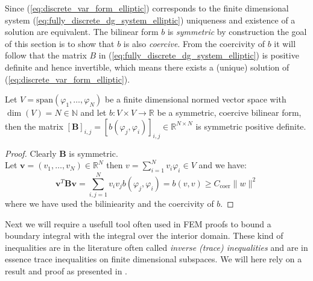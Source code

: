 Since (\ref{eq:discrete_var_form_elliptic}) corresponds to the finite dimensional
system (\ref{eq:fully_discrete_dg_system_elliptic}) uniqueness and existence of a solution
are equivalent. 
The bilinear form $b$ is \textit{symmetric} by construction 
the goal of this section is to show that $b$ is also \textit{coercive}. 
From the coercivity of $b$ it will follow that the matrix $B$ in (\ref{eq:fully_discrete_dg_system_elliptic})
is positive definite and hence invertible, which means there exists a (unique) solution
of (\ref{eq:discrete_var_form_elliptic}).
\begin{lemma}
    Let $V = \text{span}(\varphi_1,\ldots,\varphi_N)$ be a finite dimensional 
    normed vector space with $\dim(V) = N\in \mathbb{N}$ and let
    $b:V \times V \to \mathbb{R}$ be a symmetric, coercive bilinear form,
    then the matrix ${[\textbf{B}]}_{i,j} = {[b(\varphi_j, \varphi_i)]}_{i,j}\in \mathbb{R}^{N\times N}$
    is symmetric positive definite.
\end{lemma}
\begin{proof}
    Clearly $\textbf{B}$ is symmetric. \\
    Let $\textbf{v}=(v_1,\ldots,v_N)\in \mathbb{R}^N$ then $v = \sum_{i=1}^{N}
    v_i \varphi_i\in V$ and we have:
    \[
        \textbf{v}^{T}\textbf{B}\textbf{v} = \sum_{i,j=1}^{N}v_i v_j b(\varphi_j,\varphi_i) = b(v,v) \geq
        C_{\text{coer}} \|w\|^2
    \]
    where we have used the biliniearity and the coercivity of $b$.
\end{proof}
Next we will require a usefull tool often used in FEM proofs to bound
a boundary integral with the integral over the interior domain. These kind
of inequalities are in the literature often called \textit{inverse (trace) inequalities}
and are in essence trace inequalities on finite dimensional subspaces.
We will here rely on a result and proof as presented in \cite{warburtonHesthaven2003ineq}.

